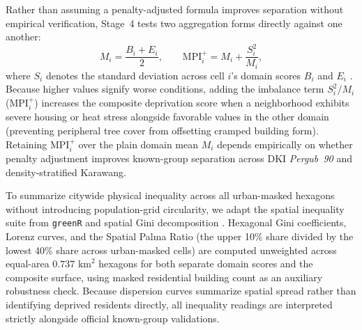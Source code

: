 Rather than assuming a penalty-adjusted formula improves separation without empirical verification, Stage~4 tests two aggregation forms directly against one another:
\begin{equation}
    M_i = \frac{B_i + E_i}{2}, \qquad \text{MPI}_i^+ = M_i + \frac{S_i^2}{M_i},
\end{equation}
where $S_i$ denotes the standard deviation across cell $i$'s domain scores $B_i$ and $E_i$ \citep{Mazziotta2016, OECD2008}. Because higher values signify worse conditions, adding the imbalance term $S_i^2 / M_i$ ($\text{MPI}_i^+$) increases the composite deprivation score when a neighborhood exhibits severe housing or heat stress alongside favorable values in the other domain (preventing peripheral tree cover from offsetting cramped building form). Retaining $\text{MPI}_i^+$ over the plain domain mean $M_i$ depends empirically on whether penalty adjustment improves known-group separation across DKI \textit{Pergub~90} and density-stratified Karawang.

To summarize citywide physical inequality across all urban-masked hexagons without introducing population-grid circularity, we adapt the spatial inequality suite from \texttt{greenR} \citep{Mahajan2024} and spatial Gini decomposition \citep{Rey2013}. Hexagonal Gini coefficients, Lorenz curves, and the Spatial Palma Ratio (the upper 10\% share divided by the lowest 40\% share across urban-masked cells) are computed unweighted across equal-area $0.737\text{ km}^2$ hexagons for both separate domain scores and the composite surface, using masked residential building count as an auxiliary robustness check. Because dispersion curves summarize spatial spread rather than identifying deprived residents directly, all inequality readings are interpreted strictly alongside official known-group validations.

